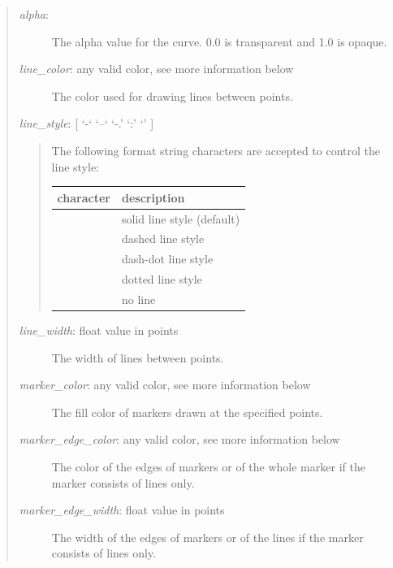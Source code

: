 \documentclass[letterpaper,10pt,english]{sphinxmanual}
\begin{document}
\begin{fulllineitems}
\begin{fulllineitems}
\begin{quote}
\begin{description}
\item[{\emph{alpha}: }] \leavevmode
The alpha value for the curve. 0.0 is transparent and 1.0 is opaque.

\item[{\emph{line\_color}: any valid color, see more information below}] \leavevmode
The color used for drawing lines between points.

\end{description}

\emph{line\_style}: {[} `-` \textbar{} `--` \textbar{} `-.' \textbar{} `:' \textbar{} `' {]}
\begin{quote}

The following format string characters are accepted to control
the line style:

\begin{tabulary}{\linewidth}{|L|L|}
\hline
\textbf{
character
} & \textbf{
description
}\\\hline

 & 
solid line style (default)
\\\hline

 & 
dashed line style
\\\hline

 & 
dash-dot line style
\\\hline

 & 
dotted line style
\\\hline

 & 
no line
\\\hline
\end{tabulary}

\end{quote}
\begin{description}
\item[{\emph{line\_width}: float value in points}] \leavevmode
The width of lines between points.

\item[{\emph{marker\_color}: any valid color, see more information below}] \leavevmode
The fill color of markers drawn at the specified points.

\item[{\emph{marker\_edge\_color}: any valid color, see more information below}] \leavevmode
The color of the edges of markers or of the whole marker if the
marker consists of lines only.

\item[{\emph{marker\_edge\_width}: float value in points}] \leavevmode
The width of the edges of markers or of the lines if the marker 
consists of lines only.


\end{description}
\end{quote}
\end{fulllineitems}
\end{fulllineitems}
\end{document}
